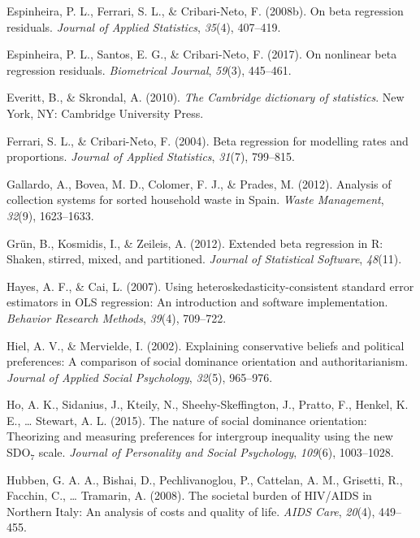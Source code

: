 \documentclass[english,man]{apa6}
\newcounter{author}
\theoremstyle{definition}
\theoremstyle{definition}
\theoremstyle{remark}
\begin{document}
\hypertarget{ref-espinheira2008beta}{}
Espinheira, P. L., Ferrari, S. L., \& Cribari-Neto, F. (2008b). On beta
regression residuals. \emph{Journal of Applied Statistics},
\emph{35}(4), 407--419.

\hypertarget{ref-espinheira2017nonlinear}{}
Espinheira, P. L., Santos, E. G., \& Cribari-Neto, F. (2017). On
nonlinear beta regression residuals. \emph{Biometrical Journal},
\emph{59}(3), 445--461.

\hypertarget{ref-everitt2002cambridge}{}
Everitt, B., \& Skrondal, A. (2010). \emph{The Cambridge dictionary of
statistics}. New York, NY: Cambridge University Press.

\hypertarget{ref-ferrari2004beta}{}
Ferrari, S. L., \& Cribari-Neto, F. (2004). Beta regression for
modelling rates and proportions. \emph{Journal of Applied Statistics},
\emph{31}(7), 799--815.

\hypertarget{ref-gallardo2012analysis}{}
Gallardo, A., Bovea, M. D., Colomer, F. J., \& Prades, M. (2012).
Analysis of collection systems for sorted household waste in Spain.
\emph{Waste Management}, \emph{32}(9), 1623--1633.

\hypertarget{ref-grun2012extended}{}
Grün, B., Kosmidis, I., \& Zeileis, A. (2012). Extended beta regression
in R: Shaken, stirred, mixed, and partitioned. \emph{Journal of
Statistical Software}, \emph{48}(11).

\hypertarget{ref-hayes2007using}{}
Hayes, A. F., \& Cai, L. (2007). Using heteroskedasticity-consistent
standard error estimators in OLS regression: An introduction and
software implementation. \emph{Behavior Research Methods}, \emph{39}(4),
709--722.

\hypertarget{ref-hiel2002explaining}{}
Hiel, A. V., \& Mervielde, I. (2002). Explaining conservative beliefs
and political preferences: A comparison of social dominance orientation
and authoritarianism. \emph{Journal of Applied Social Psychology},
\emph{32}(5), 965--976.

\hypertarget{ref-ho2015nature}{}
Ho, A. K., Sidanius, J., Kteily, N., Sheehy-Skeffington, J., Pratto, F.,
Henkel, K. E., \ldots{} Stewart, A. L. (2015). The nature of social
dominance orientation: Theorizing and measuring preferences for
intergroup inequality using the new SDO\(_7\) scale. \emph{Journal of
Personality and Social Psychology}, \emph{109}(6), 1003--1028.

\hypertarget{ref-hubben2008societal}{}
Hubben, G. A. A., Bishai, D., Pechlivanoglou, P., Cattelan, A. M.,
Grisetti, R., Facchin, C., \ldots{} Tramarin, A. (2008). The societal
burden of HIV/AIDS in Northern Italy: An analysis of costs and quality
of life. \emph{AIDS Care}, \emph{20}(4), 449--455.
\end{document}
